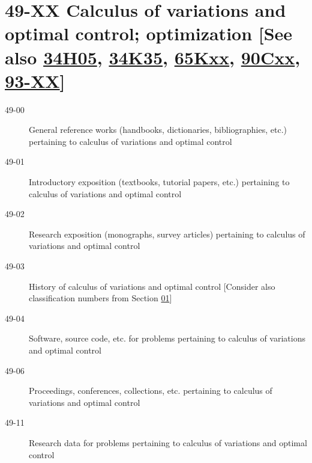 \section*{49-XX Calculus of variations and optimal control; optimization [See also \hyperref[34H05]{34H05}, \hyperref[34K35]{34K35}, \hyperref[65Kxx]{65Kxx}, \hyperref[90Cxx]{90Cxx}, \hyperref[93-XX]{93-XX}] }\label{49-XX}
\begin{description}
\item [49-00]\label{49-00} General reference works (handbooks, dictionaries, bibliographies, etc.) pertaining to calculus of variations and optimal control
\item [49-01]\label{49-01} Introductory exposition (textbooks, tutorial papers, etc.) pertaining to calculus of variations and optimal control
\item [49-02]\label{49-02} Research exposition (monographs, survey articles) pertaining to calculus of variations and optimal control
\item [49-03]\label{49-03} History of calculus of variations and optimal control [Consider also classification numbers from Section \hyperref[01-XX]{01}]
\item [49-04]\label{49-04} Software, source code, etc. for problems pertaining to calculus of variations and optimal control
\item [49-06]\label{49-06} Proceedings, conferences, collections, etc. pertaining to calculus of variations and optimal control
\item [49-11]\label{49-11} Research data for problems pertaining to calculus of variations and optimal control
\end{description}
